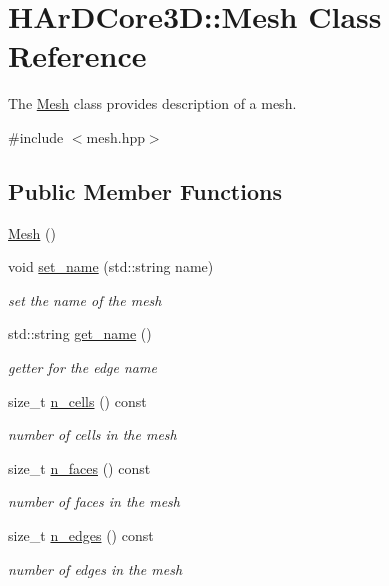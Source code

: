 \hypertarget{classHArDCore3D_1_1Mesh}{}\section{H\+Ar\+D\+Core3D\+:\+:Mesh Class Reference}
\label{classHArDCore3D_1_1Mesh}


The \hyperlink{classHArDCore3D_1_1Mesh}{Mesh} class provides description of a mesh.  




{\ttfamily \#include $<$mesh.\+hpp$>$}

\subsection*{Public Member Functions}
\begin{DoxyCompactItemize}
\item 
\hyperlink{classHArDCore3D_1_1Mesh_a2af137f1571af89172b9c102302c416b}{Mesh} ()
\item 
void \hyperlink{group__Mesh_ga694cc6fe11d3640859f7f2c23c8acd44}{set\+\_\+name} (std\+::string name)
\begin{DoxyCompactList}\small\item\em set the name of the mesh \end{DoxyCompactList}\item 
std\+::string \hyperlink{group__Mesh_ga2140b63286e05a457a914ca1a1455c2a}{get\+\_\+name} ()
\begin{DoxyCompactList}\small\item\em getter for the edge name \end{DoxyCompactList}\item 
size\+\_\+t \hyperlink{group__Mesh_ga60fb49998f950bad0659d1ac394d7cfd}{n\+\_\+cells} () const
\begin{DoxyCompactList}\small\item\em number of cells in the mesh \end{DoxyCompactList}\item 
size\+\_\+t \hyperlink{group__Mesh_ga95cf99c07e92c81332fb534372ad7ff7}{n\+\_\+faces} () const
\begin{DoxyCompactList}\small\item\em number of faces in the mesh \end{DoxyCompactList}\item 
size\+\_\+t \hyperlink{group__Mesh_ga145d728300f3cc4e156919ce635efdfc}{n\+\_\+edges} () const
\begin{DoxyCompactList}\small\item\em number of edges in the mesh \end{DoxyCompactList}\item 

\end{DoxyCompactItemize}
